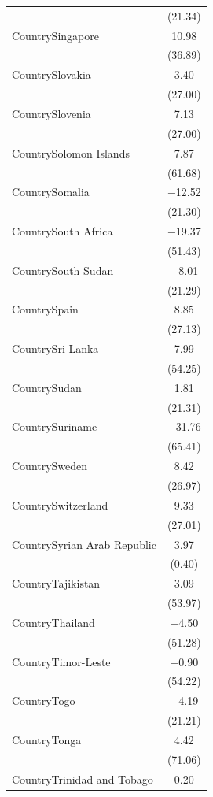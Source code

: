 \documentclass[
  letterpaper,
  DIV=11,
  numbers=noendperiod]{scrartcl}
\begin{document}
\begin{table}
{\begin{tabular}[t]{lc}
 & (\num{21.34})\\
CountrySingapore & \num{10.98}\\
 & (\num{36.89})\\
CountrySlovakia & \num{3.40}\\
 & \vphantom{1} (\num{27.00})\\
CountrySlovenia & \num{7.13}\\
 & (\num{27.00})\\
CountrySolomon Islands & \num{7.87}\\
 & (\num{61.68})\\
CountrySomalia & \num{-12.52}\\
 & (\num{21.30})\\
CountrySouth Africa & \num{-19.37}\\
 & (\num{51.43})\\
CountrySouth Sudan & \num{-8.01}\\
 & (\num{21.29})\\
CountrySpain & \num{8.85}\\
 & (\num{27.13})\\
CountrySri Lanka & \num{7.99}\\
 & (\num{54.25})\\
CountrySudan & \num{1.81}\\
 & (\num{21.31})\\
CountrySuriname & \num{-31.76}\\
 & (\num{65.41})\\
CountrySweden & \num{8.42}\\
 & (\num{26.97})\\
CountrySwitzerland & \num{9.33}\\
 & (\num{27.01})\\
CountrySyrian Arab Republic & \num{3.97}\\
 & \vphantom{1} (\num{0.40})\\
CountryTajikistan & \num{3.09}\\
 & (\num{53.97})\\
CountryThailand & \num{-4.50}\\
 & (\num{51.28})\\
CountryTimor-Leste & \num{-0.90}\\
 & (\num{54.22})\\
CountryTogo & \num{-4.19}\\
 & (\num{21.21})\\
CountryTonga & \num{4.42}\\
 & (\num{71.06})\\
CountryTrinidad and Tobago & \num{0.20}\\

\end{tabular}}
\end{table}
\end{document}
